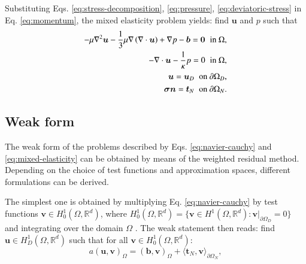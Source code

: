 \documentclass[english,11pt,3p,number,sort&compress]{elsarticle}
\begin{document}
Substituting Eqs. \eqref{eq:stress-decomposition}, \eqref{eq:pressure}, \eqref{eq:deviatoric-stress} in Eq. \eqref{eq:momentum}, the mixed elasticity problem yields: find $\bm{u}$ and $p$ such that
\begin{subequations} \label{eq:mixed-elasticity}
	\begin{align}
		-\mu\nabla^2\bm{u} -\frac{1}{3}\mu\nabla\left(\nabla \cdot \bm{u} \right) + \nabla p -\bm{b}= \bm{0} \hspace{0.2cm} \text{in } \Omega ,& \label{eq:mixed-elasticity-a}\\ 
		-\nabla \cdot \bm{u} -\frac{1}{\kappa}p= 0 \hspace{0.2cm} \text{in } \Omega ,& \label{eq:mixed-elasticity-b}\\ 
		\bm{u} = \bm{u}_D \hspace{0.2cm} \text{on } \partial\Omega_D ,&\\
		\bm{\sigma} \bm{n} = \bm{t}_N \hspace{0.2cm} \text{on } \partial\Omega_N .&
	\end{align}
\end{subequations}

\subsection{Weak form}

The weak form of the problems described by Eqs. \eqref{eq:navier-cauchy} and \eqref{eq:mixed-elasticity} can be obtained by means of the weighted residual method. Depending on the choice of test functions and approximation spaces, different formulations can be derived.

The simplest one is obtained by multiplying Eq. \eqref{eq:navier-cauchy} by test functions $\bm{v} \in H^1_0(\Omega,\mathbb{R}^d)$, where $H^1_0(\Omega,\mathbb{R}^d)=\{\bm{v} \in H^1(\Omega,\mathbb{R}^d) : \bm{v} \lvert_{\partial\Omega_D}=0 \}$ and integrating over the domain $\Omega$ \cite{becker1981finite}. The weak statement then reads: find $\bm{u} \in H^1_D(\Omega,\mathbb{R}^d)$ such that for all $\bm{v} \in H^1_0(\Omega,\mathbb{R}^d)$:
\begin{equation} \label{eq:weak-primal-displacement}
    a\left(\bm{u},\bm{v}\right)_\Omega = \left(\bm{b},\bm{v}\right)_\Omega + \langle\bm{t}_N,\bm{v}\rangle_{\partial\Omega_N},
\end{equation}
\end{document}
